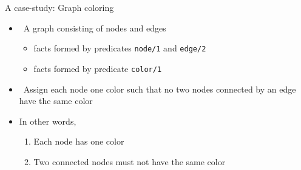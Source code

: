 % 

% 
% 
% 
% 
% 
% 

\begin{frame}{A case-study: Graph coloring}
  \bigskip
  \begin{itemize}
  \item<2->  \ A graph consisting of nodes and edges
    \begin{itemize}\normalsize
    \item<visible@4-> facts formed by predicates \texttt{node/1} and \texttt{edge/2}
    \item<only@5->    facts formed by predicate  \texttt{color/1}
    \end{itemize}
    \medskip
  \item<only@6->  \ Assign each node one color such that no two nodes connected
    by an edge have the same color
    \medskip
  \item<only@7-> [] In other words,
    \begin{enumerate}\normalsize
    \item Each node has one color
    \item Two connected nodes must not have the same color
    \end{enumerate}
  \end{itemize}
  \centering
\end{frame}

